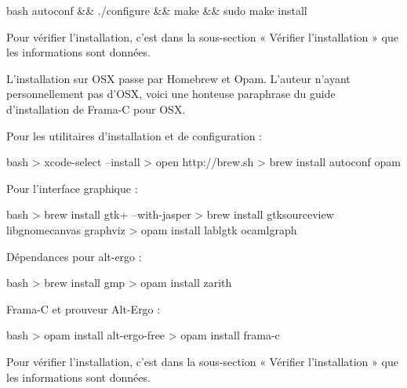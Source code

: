 \begin{CodeBlock}{bash}
autoconf && ./configure && make && sudo make install
\end{CodeBlock}



Pour vérifier l'installation, c'est dans la sous-section « Vérifier l'installation »
que les informations sont données.





L'installation sur OSX passe par Homebrew et Opam. L'auteur n'ayant
personnellement pas d'OSX, voici une honteuse paraphrase du guide
d'installation de Frama-C pour OSX.



Pour les utilitaires d'installation et de configuration :



\begin{CodeBlock}{bash}
> xcode-select --install
> open http://brew.sh
> brew install autoconf opam
\end{CodeBlock}



Pour l'interface graphique :



\begin{CodeBlock}{bash}
> brew install gtk+ --with-jasper
> brew install gtksourceview libgnomecanvas graphviz
> opam install lablgtk ocamlgraph
\end{CodeBlock}



Dépendances pour alt-ergo :



\begin{CodeBlock}{bash}
> brew install gmp
> opam install zarith
\end{CodeBlock}



Frama-C et prouveur Alt-Ergo :



\begin{CodeBlock}{bash}
> opam install alt-ergo-free
> opam install frama-c
\end{CodeBlock}



Pour vérifier l'installation, c'est dans la sous-section « Vérifier l'installation »
que les informations sont données.





